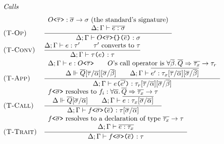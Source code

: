 \begin{figure}[htbp]
\[
\begin{array}{@{}l@{\quad}l@{}}
\multicolumn{2}{@{}l}{\text{\textit{Calls}}}
\\[7pt]
\textsc{(T-Op)} & \dfrac{\begin{array}{c} O\texttt{<}\overline{\tau}\texttt{>} : \overline{\sigma} \to \sigma \text{ (the standard's signature)} \\ \Delta; \Gamma \vdash \overline{e : \sigma} \end{array}}{\Delta; \Gamma \vdash O\texttt{<}\overline{\tau}\texttt{>\{\}(}\overline{e}\texttt{)} : \sigma}
\\[7pt]
\textsc{(T-Conv)} & \dfrac{\Delta; \Gamma \vdash e : \tau' \qquad \tau' \text{ converts to } \tau}{\Delta; \Gamma \vdash \tau\texttt{(}e\texttt{)} : \tau}
\\[7pt]
\textsc{(T-App)} & \dfrac{\begin{array}{c} \Delta; \Gamma \vdash e : O\texttt{<}\overline{\tau}\texttt{>} \qquad O\text{'s call operator is } \forall\overline{\beta}.\,\overline{Q} \Rightarrow \overline{\tau_x} \to \tau_r \\ \Delta \Vdash \overline{Q}[\overline{\tau}/\overline{\alpha}][\overline{\sigma}/\overline{\beta}] \qquad \Delta; \Gamma \vdash \overline{e' : \tau_x[\overline{\tau}/\overline{\alpha}][\overline{\sigma}/\overline{\beta}]} \end{array}}{\Delta; \Gamma \vdash e\texttt{(}\overline{e'}\texttt{)} : \tau_r[\overline{\tau}/\overline{\alpha}][\overline{\sigma}/\overline{\beta}]}
\\[7pt]
\textsc{(T-Call)} & \dfrac{\begin{array}{c} f\texttt{<}\overline{\sigma}\texttt{>} \text{ resolves to } f_i : \forall\overline{\alpha}.\,\overline{Q} \Rightarrow \overline{\tau_x} \to \tau \\ \Delta \Vdash \overline{Q}[\overline{\sigma}/\overline{\alpha}] \qquad \Delta; \Gamma \vdash \overline{e : \tau_x[\overline{\sigma}/\overline{\alpha}]} \end{array}}{\Delta; \Gamma \vdash f\texttt{<}\overline{\sigma}\texttt{>(}\overline{e}\texttt{)} : \tau[\overline{\sigma}/\overline{\alpha}]}
\\[7pt]
\textsc{(T-Trait)} & \dfrac{\begin{array}{c} f\texttt{<}\overline{\sigma}\texttt{>} \text{ resolves to a declaration of type } \overline{\tau_x} \to \tau \\ \Delta; \Gamma \vdash \overline{e : \tau_x} \end{array}}{\Delta; \Gamma \vdash f\texttt{<}\overline{\sigma}\texttt{>(}\overline{e}\texttt{)} : \tau}

\end{array}\]
\end{figure}

